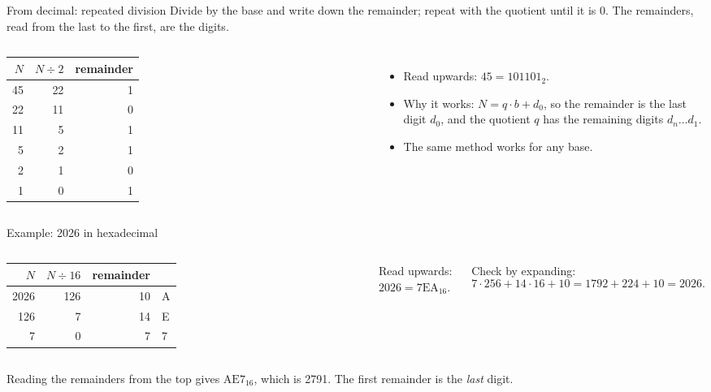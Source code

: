 \documentclass[10pt]{wosm-slides}
\makeatletter
\newcommand*\base[2]{\ensuremath{\mathrm{#1}_{#2}}}
\newenvironment{steps}[1]
  {\begin{tabular}{@{}#1@{}}\toprule}
  {\bottomrule\end{tabular}}
\makeatother
\begin{document}
\begin{frame}{From decimal: repeated division}
  Divide by the base and write down the remainder; repeat with the quotient until
  it is 0. The remainders, read from the \alert{last to the first}, are the digits.

  \medskip
  \begin{columns}[T, totalwidth=\textwidth]
      \small
      \begin{steps}{rrr}
        $N$ & $N \div 2$ & remainder \\
        \midrule
        45 & 22 & 1 \\
        22 & 11 & 0 \\
        11 & 5 & 1 \\
        5 & 2 & 1 \\
        2 & 1 & 0 \\
        1 & 0 & 1 \\
      \end{steps}
      \begin{itemize}
        \item Read upwards: $45 = \base{101101}{2}$.
        \item Why it works: $N = q \cdot b + d_0$, so the remainder is the last
          digit $d_0$, and the quotient $q$ has the remaining digits
          $d_n \dots d_1$.
        \item The same method works for any base.
      \end{itemize}
  \end{columns}
\end{frame}

\begin{frame}{Example: 2026 in hexadecimal}
  \begin{columns}[T, totalwidth=\textwidth]
      \small
      \begin{steps}{rrrl}
        $N$ & $N \div 16$ & remainder & \\
        \midrule
        2026 & 126 & 10 & A \\
        126 & 7 & 14 & E \\
        7 & 0 & 7 & 7 \\
      \end{steps}
      Read upwards: $2026 = \base{7EA}{16}$.

      \medskip
      Check by expanding:
      \[
        7 \cdot 256 + 14 \cdot 16 + 10 = 1792 + 224 + 10 = 2026 .
      \]
  \end{columns}

  \bigskip
  \begin{warning}
    Reading the remainders from the top gives \base{AE7}{16}, which is 2791. The
    first remainder is the \emph{last} digit.
  \end{warning}
\end{frame}
\end{document}
